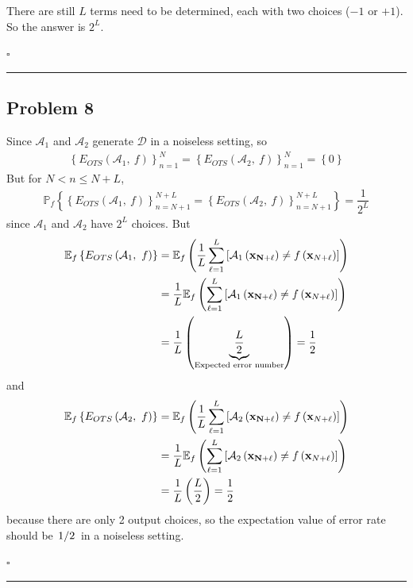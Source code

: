 \documentclass[12pt]{article}
\newcommand*{\QEDB}{\hfill\ensuremath{\square}}
\newcommand{\CBrackets}[1]{\left\{#1\right\}}
\newcommand{\SBrackets}[1]{\left[#1\right]}
\newcommand{\ParTh}[1]{\left(#1\right)}
\newcommand{\BF}[1]{{\bf#1}}
\newcommand{\Divide}[2]{\left.#1\middle/#2\right.}
\newcommand{\horrule}[1]{\rule{\linewidth}{#1}}
\begin{document}
There are still $L$ terms need to be determined, each with two choices ($-1$ or $+1$). So the answer is $2^L$.

\QEDB

\horrule{0.5pt}

\subsection*{Problem 8}

Since $\mathcal{A}_1$ and $\mathcal{A}_2$ generate $\mathcal{D}$ in a noiseless setting, so
\begin{align}
\CBrackets{E_{OTS}\ParTh{\mathcal{A}_1,~f}}^N_{n=1}=\CBrackets{E_{OTS}\ParTh{\mathcal{A}_2,~f}}^N_{n=1}=\CBrackets{0}
\end{align}
But for $N<n\leq N+L$,
\begin{align}
\mathbb{P}_f\CBrackets{\CBrackets{E_{OTS}\ParTh{\mathcal{A}_1,~f}}^{N+L}_{n=N+1}=\CBrackets{E_{OTS}\ParTh{\mathcal{A}_2,~f}}^{N+L}_{n=N+1}}=\dfrac{1}{2^L}
\end{align}
since $\mathcal{A}_1$ and $\mathcal{A}_2$ have $2^L$ choices. But
\begin{align}
\mathbb{E}_f\CBrackets{E_{OTS}\ParTh{\mathcal{A}_1,~f}}&=\mathbb{E}_f\ParTh{\dfrac{1}{L}\sum_{\ell=1}^{L}\SBrackets{\mathcal{A}_1\ParTh{\BF{x_{N+\ell}}}\neq f\ParTh{\BF{x}_{N+\ell}}}}
\\
&=\dfrac{1}{L}\mathbb{E}_f\ParTh{\sum_{\ell=1}^{L}\SBrackets{\mathcal{A}_1\ParTh{\BF{x_{N+\ell}}}\neq f\ParTh{\BF{x}_{N+\ell}}}}\\
&=\dfrac{1}{L}\ParTh{\underbrace{\dfrac{L}{2}}_{\text{Expected error number}}}=\dfrac{1}{2}
\end{align}
and
\begin{align}
\mathbb{E}_f\CBrackets{E_{OTS}\ParTh{\mathcal{A}_2,~f}}&=\mathbb{E}_f\ParTh{\dfrac{1}{L}\sum_{\ell=1}^{L}\SBrackets{\mathcal{A}_2\ParTh{\BF{x_{N+\ell}}}\neq f\ParTh{\BF{x}_{N+\ell}}}}
\\
&=\dfrac{1}{L}\mathbb{E}_f\ParTh{\sum_{\ell=1}^{L}\SBrackets{\mathcal{A}_2\ParTh{\BF{x_{N+\ell}}}\neq f\ParTh{\BF{x}_{N+\ell}}}}\\
&=\dfrac{1}{L}\ParTh{\dfrac{L}{2}}=\dfrac{1}{2}
\end{align}
because there are only 2 output choices, so the expectation value of error rate should be $\Divide{1}{2}$ in a noiseless setting.

\QEDB

\horrule{0.5pt}
\end{document}

